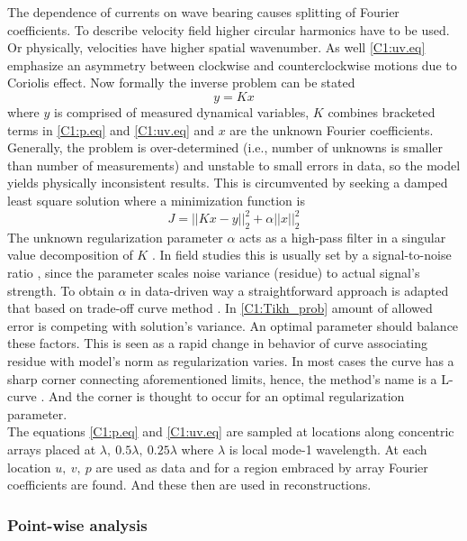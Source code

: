 \documentclass[12pt]{article}
\begin{document}
The dependence of currents on wave bearing causes splitting of Fourier coefficients. To describe 
velocity field higher circular harmonics have to be used. Or physically, velocities have higher 
spatial wavenumber. As well \eqref{C1:uv.eq} emphasize an asymmetry between clockwise 
and counterclockwise motions due to Coriolis effect. Now formally the inverse problem can be stated 
\begin{equation}
y = K x
\end{equation}
where $y$ is comprised of measured dynamical variables, $K$ combines bracketed terms in 
\eqref{C1:p.eq} and \eqref{C1:uv.eq} and $x$ are the unknown Fourier coefficients. Generally, the 
problem is over-determined (i.e., number of unknowns is smaller than number of 
measurements) and unstable to small errors in data, so the model yields physically inconsistent 
results. This is circumvented by seeking a damped least square solution \citep{munk2009ocean} where 
a minimization function is 
\begin{equation}
\label{C1:Tikh_prob}
J = ||K x - y||^2_2 + \alpha ||x||^2_2
\end{equation}
The unknown regularization parameter $\alpha$ acts as a high-pass filter in a singular value 
decomposition of $K$ \citep{bennett1992inverse}. In field studies this is usually set by a 
signal-to-noise ratio \citep{munk2009ocean}, since the parameter scales noise variance (residue) 
to actual signal's strength. To obtain $\alpha$ in data-driven way a straightforward approach is 
adapted that based on 
trade-off curve method \citep{hansen1993use}. In \eqref{C1:Tikh_prob} amount of allowed error 
is competing with solution's variance. An optimal parameter should balance these factors. This is 
seen as a rapid change in behavior of curve associating residue with model's norm as regularization 
varies. In most cases the curve has a sharp corner connecting aforementioned limits, hence, the 
method's name is a L-curve \citep{hansen1999curve}. And the corner is thought to occur for an 
optimal regularization parameter.\\
The equations \eqref{C1:p.eq} and \eqref{C1:uv.eq} are sampled at locations along concentric 
arrays placed at $\lambda,~0.5\lambda,~0.25\lambda$ where $\lambda$ is local mode-1 wavelength. 
At each location $u,~v,~p$ are used as data and for a region embraced by array Fourier coefficients 
are found. And these then are used in reconstructions.
\subsubsection{Point-wise analysis}
\label{C3.app:A2}
\end{document}
